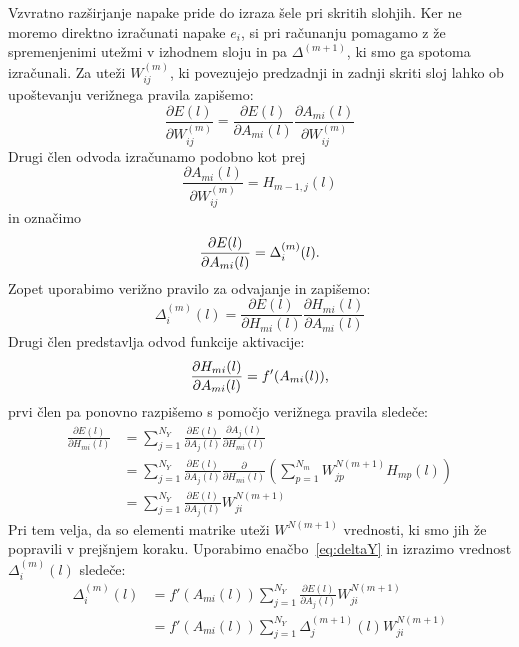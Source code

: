 \documentclass[mat1]{fmfdelo}
\begin{document}
Vzvratno razširjanje napake pride do izraza šele pri skritih slohjih. Ker ne moremo direktno izračunati napake $e_i$, si pri računanju pomagamo z že spremenjenimi utežmi v izhodnem sloju in pa $\Delta^{(m+1)}$, ki smo ga spotoma izračunali. Za uteži $W^{(m)}_{ij}$, ki povezujejo predzadnji in zadnji skriti sloj lahko ob upoštevanju verižnega pravila zapišemo:
%
\begin{equation*}
 \frac{\partial E(l)}{\partial W^{(m)}_{ij}} = \frac{\partial E(l)}{\partial A_{mi}(l)} \frac{\partial A_{mi}(l)}{\partial W^{(m)}_{ij}}
\end{equation*}
%
Drugi člen odvoda izračunamo podobno kot prej
\begin{equation*}
\frac{\partial A_{mi}(l)}{\partial W^{(m)}_{ij}} = H_{m-1,j}(l)
\end{equation*}
%
in označimo
%
\begin{equation*}
\frac{\partial E(l)}{\partial A_{mi}(l)} = \Delta^{(m)}_i(l) \text.
\end{equation*}
%
Zopet uporabimo verižno pravilo za odvajanje in zapišemo:
%
\begin{equation*}
\Delta^{(m)}_i(l) = \frac{\partial E(l)}{\partial H_{mi}(l)}\frac{\partial H_{mi}(l)}{\partial A_{mi}(l)}
\end{equation*}
%
Drugi člen predstavlja odvod funkcije aktivacije:
%
\begin{equation*}
\frac{\partial H_{mi}(l)}{\partial A_{mi}(l)} =  f'(A_{mi}(l)) \text,
\end{equation*}
%
prvi člen pa ponovno razpišemo s pomočjo verižnega pravila sledeče:
%
\begin{equation*}
\begin{aligned}
\frac{\partial E(l)}{\partial H_{mi}(l)} &=  \sum^{N_Y}_{j=1} \frac{\partial E(l)}{\partial A_j(l)}\frac{\partial A_j(l)}{\partial H_{mi}(l)}  \\
& =   \sum^{N_Y}_{j=1} \frac{\partial E(l)}{\partial A_j(l)}\frac{\partial}{\partial H_{mi}(l)} \left(\sum^{N_m}_{p=1} W^{N (m+1)}_{jp}H_{mp}(l)\right)\\
&= \sum^{N_Y}_{j=1} \frac{\partial E(l)}{\partial A_j(l)} W^{N (m+1)}_{ji}
\end{aligned}
\end{equation*}
%
Pri tem velja, da so elementi matrike uteži $W^{N(m+1)}$ vrednosti, ki smo jih že popravili v prejšnjem koraku. Uporabimo enačbo~\eqref{eq:deltaY} in izrazimo vrednost $\Delta^{(m)}_i(l)$ sledeče:
%
\begin{equation*}
\begin{aligned}
\Delta^{(m)}_i(l) &= f'(A_{mi}(l))  \sum^{N_Y}_{j=1} \frac{\partial E(l)}{\partial A_j(l)} W^{N (m+1)}_{ji} \\
&= f'(A_{mi}(l))  \sum^{N_Y}_{j=1} \Delta ^{(m+1)}_j(l)W^{N (m+1)}_{ji}
\end{aligned}
\end{equation*}
\end{document}
